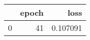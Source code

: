 \begin{tabular}{lrr}
\toprule
 & epoch & loss \\
\midrule
0 & 41 & 0.107091 \\
\bottomrule
\end{tabular}
